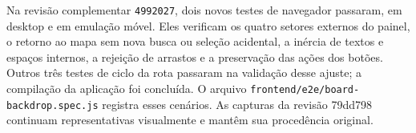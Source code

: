 Na revisão complementar \texttt{4992027}, dois novos testes de navegador passaram, em desktop e em emulação móvel. Eles verificam os quatro setores externos do painel, o retorno ao mapa sem nova busca ou seleção acidental, a inércia de textos e espaços internos, a rejeição de arrastos e a preservação das ações dos botões. Outros três testes de ciclo da rota passaram na validação desse ajuste; a compilação da aplicação foi concluída. O arquivo \nolinkurl{frontend/e2e/board-backdrop.spec.js} registra esses cenários. As capturas da revisão 79dd798 continuam representativas visualmente e mantêm sua procedência original.
